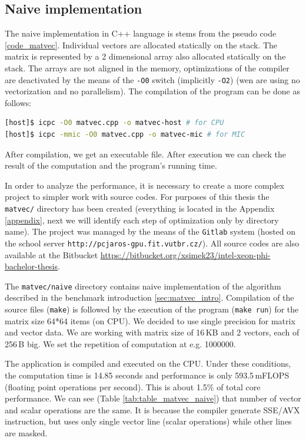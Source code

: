\subsection{Naive implementation}
The naive implementation in C++ language is stems from the pseudo code \ref{code_matvec}. Individual vectors are allocated statically on the stack. The matrix is represented by a 2 dimensional array also allocated statically on the stack. The arrays are not aligned in the memory, optimizations of the compiler are deactivated by the means of the \texttt{-O0} switch (implicitly \texttt{-O2}) (wen are using no vectorization and no parallelism). The compilation of the program can be done as follows:

\bigskip
\begin{lstlisting}[caption=The compilation for CPU and MIC., captionpos=b, label=code_compilation, language=bash]
[host]$ icpc -O0 matvec.cpp -o matvec-host # for CPU
[host]$ icpc -mmic -O0 matvec.cpp -o matvec-mic # for MIC
\end{lstlisting}
\bigskip

After compilation, we get an executable file. After execution we can check the result of the computation and the program's running time.

\par In order to analyze the performance, it is necessary to create a more complex project to simpler work with source codes. For purposes of this thesis the \texttt{matvec/} directory has been created (everything is located in the Appendix \ref{appendix}, next we will identify each step of optimization only by directory name). The project was managed by the means of the \texttt{Gitlab} system (hosted on the school server \texttt{http://pcjaros-gpu.fit.vutbr.cz/}). All source codes are also available at the Bitbucket \url{https://bitbucket.org/xsimek23/intel-xeon-phi-bachelor-thesis}.

\par The \texttt{matvec/naive} directory contains naive implementation of the algorithm described in the benchmark introduction \ref{sec:matvec_intro}. Compilation of the source files (\texttt{make}) is followed by the execution of the program (\texttt{make run}) for the matrix size 64*64 items (on CPU). We decided to use single precision for matrix and vector data. We are working with matrix size of 16\,KB and 2 vectors, each of 256\,B big. We set the repetition of computation at e.g. 1000000.

\par The application is compiled and executed on the CPU. Under these conditions, the computation time is 14.85 seconds and performance is only 593.5\,mFLOPS (floating point operations per second). This is about 1.5\% of total core performance. We can see (Table \ref{tab:table_matvec_naive}) that number of vector and scalar operations are the same. It is because the compiler generate SSE/AVX instruction, but uses only single vector line (scalar operations) while other lines are masked.

